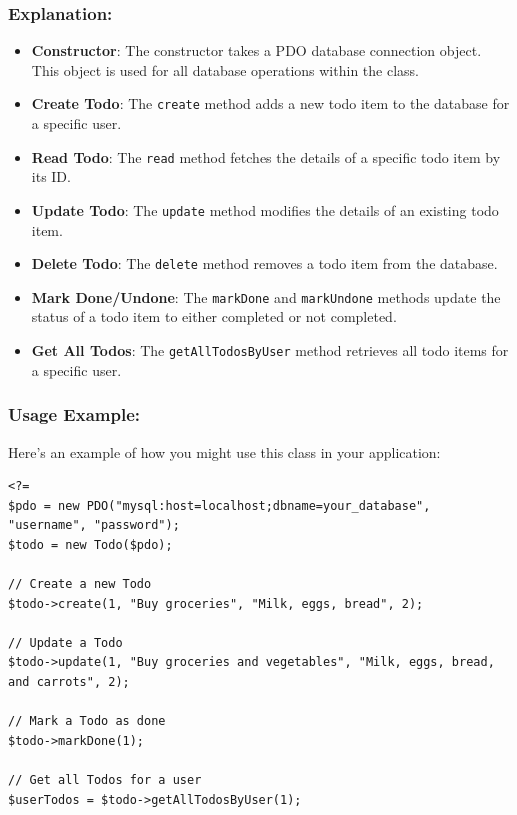 \documentclass[11pt]{article}
\begin{document}
\subsubsection{Explanation:}
\label{sec:org6892ada}
\begin{itemize}
\item \textbf{Constructor}: The constructor takes a PDO database connection object.
This object is used for all database operations within the class.

\item \textbf{Create Todo}: The \texttt{create} method adds a new todo item to the
database for a specific user.

\item \textbf{Read Todo}: The \texttt{read} method fetches the details of a specific todo
item by its ID.

\item \textbf{Update Todo}: The \texttt{update} method modifies the details of an existing
todo item.

\item \textbf{Delete Todo}: The \texttt{delete} method removes a todo item from the
database.

\item \textbf{Mark Done/Undone}: The \texttt{markDone} and \texttt{markUndone} methods update the
status of a todo item to either completed or not completed.

\item \textbf{Get All Todos}: The \texttt{getAllTodosByUser} method retrieves all todo
items for a specific user.
\end{itemize}

\subsubsection{Usage Example:}
\label{sec:org34b20b6}
Here's an example of how you might use this class in your application:

\begin{verbatim}
<?=
$pdo = new PDO("mysql:host=localhost;dbname=your_database", "username", "password");
$todo = new Todo($pdo);

// Create a new Todo
$todo->create(1, "Buy groceries", "Milk, eggs, bread", 2);

// Update a Todo
$todo->update(1, "Buy groceries and vegetables", "Milk, eggs, bread, and carrots", 2);

// Mark a Todo as done
$todo->markDone(1);

// Get all Todos for a user
$userTodos = $todo->getAllTodosByUser(1);
\end{verbatim}
\end{document}
